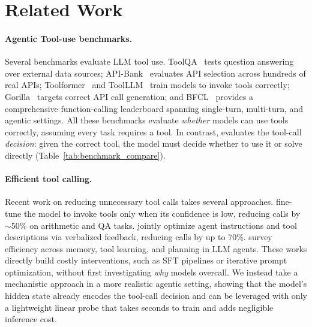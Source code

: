 \section{Related Work}
\label{sec:related}

\paragraph{Agentic Tool-use benchmarks.}
Several benchmarks evaluate LLM tool use. ToolQA~\citep{zhuang2023toolqa} tests question answering over external data sources; API-Bank~\citep{li2023api} evaluates API selection across hundreds of real APIs; Toolformer~\citep{schick2023toolformer} and ToolLLM~\citep{qin2023toolllm} train models to invoke tools correctly; Gorilla~\citep{patil2024gorilla} targets correct API call generation; and BFCL~\citep{patil2025berkeley} provides a comprehensive function-calling leaderboard spanning single-turn, multi-turn, and agentic settings. All these benchmarks evaluate \emph{whether} models can use tools correctly, assuming every task requires a tool. In contrast, \benchmark{} evaluates the tool-call \emph{decision}: given the correct tool, the model must decide whether to use it or solve directly (Table~\ref{tab:benchmark_compare}).

\paragraph{Efficient tool calling.}
Recent work on reducing unnecessary tool calls takes several approaches. \citet{xu2025alignment} fine-tune the model to invoke tools only when its confidence is low, reducing calls by $\sim$50\% on arithmetic and QA tasks. \citet{wu2025joint} jointly optimize agent instructions and tool descriptions via verbalized feedback, reducing calls by up to 70\%. \citet{yang2026toward} survey efficiency across memory, tool learning, and planning in LLM agents. These works directly build costly interventions, such as SFT pipelines or iterative prompt optimization, without first investigating \emph{why} models overcall. We instead take a mechanistic approach in a more realistic agentic setting, showing that the model's hidden state already encodes the tool-call decision and can be leveraged with only a lightweight linear probe that takes seconds to train and adds negligible inference cost.

